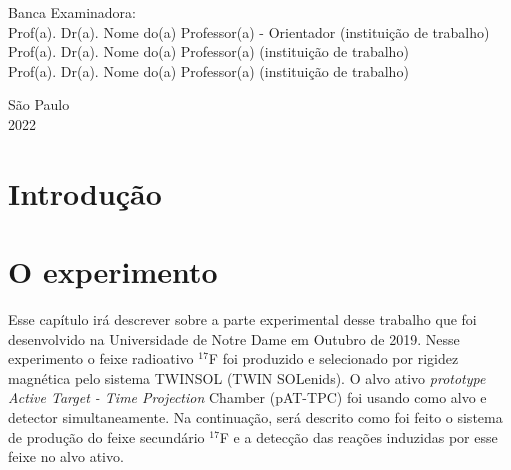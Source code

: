 \documentclass[a4paper,12pt,oneside]{book}
\begin{document}
\par
\leftskip 6cm
\par
\leftskip 0cm
\vskip 2cm


\noindent Banca Examinadora: \\
\noindent Prof(a). Dr(a). Nome do(a) Professor(a) - Orientador (institui\c{c}\~{a}o de trabalho) \\
Prof(a). Dr(a). Nome do(a) Professor(a) (institui\c{c}\~{a}o de trabalho) \\
Prof(a). Dr(a). Nome do(a) Professor(a) (institui\c{c}\~{a}o de trabalho) \\
\vspace{1.8cm}


\begin{center}
    {S\~ao Paulo \\  2022}
\end{center}%
    
\clearpage

\tableofcontents
\listoffigures
\listoftables
\listofalgorithms
\newpage

\chapter{Introdução}

\chapter{O experimento}\label{PATTPC}

\par Esse capítulo irá descrever sobre a parte experimental desse trabalho que foi desenvolvido na Universidade de Notre Dame em Outubro de 2019. Nesse experimento o feixe radioativo $^{17}$F foi produzido e selecionado por rigidez magnética pelo sistema TWINSOL (TWIN SOLenids)\cite{twinsol}. O alvo ativo \textit{prototype Active Target - Time Projection} Chamber (pAT-TPC) \cite{pattpc} foi usando como alvo e detector simultaneamente. Na continuação, será descrito como foi feito o sistema de produção do feixe secundário $^{17}$F e a detecção das reações induzidas por esse feixe no alvo ativo.
\end{document}
